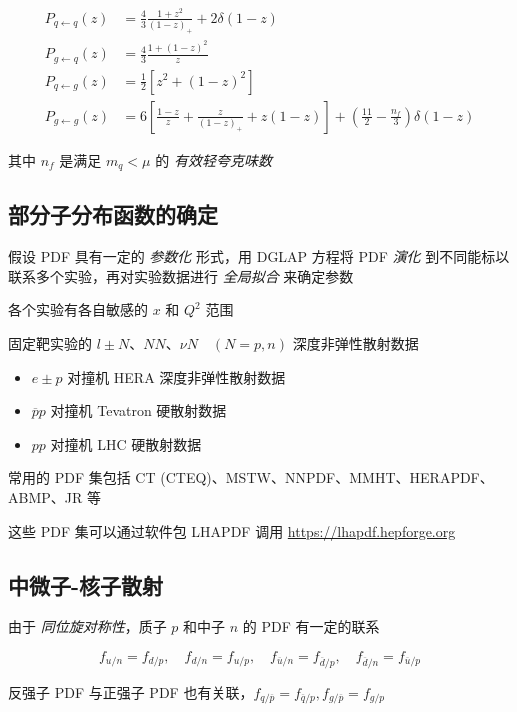 \documentclass[oneside,a4paper,openany,11pt]{ctexbook}
\begin{document}
\begin{align}
    P_{q \gets q}(z) &= \frac{4}{3} \frac{1+z^2}{(1-z)_+} + 2\delta(1-z) \\
    P_{g \gets q}(z) &= \frac{4}{3} \frac{1+(1-z)^2}{z} \\
    P_{q \gets g}(z) &= \frac{1}{2} \left[z^2 + (1-z)^2\right] \\
    P_{g \gets g}(z) &= 6 \left[\frac{1-z}{z} + \frac{z}{(1-z)_+} + z(1-z)\right] + \left(\frac{11}{2} - \frac{n_f}{3}\right) \delta(1-z)
\end{align}

其中 $n_f$ 是满足 $m_q < \mu$ 的 \emph{有效轻夸克味数}

\subsection{部分子分布函数的确定}

假设 PDF 具有一定的 \emph{参数化} 形式，用 DGLAP 方程将 PDF \emph{演化} 到不同能标以联系多个实验，再对实验数据进行 \emph{全局拟合} 来确定参数

各个实验有各自敏感的 $x$ 和 $Q^2$ 范围

固定靶实验的 $l \pm N$、$NN$、$\nu N \quad (N = p, n)$ 深度非弹性散射数据

\begin{itemize}
    \item $e \pm p$ 对撞机 HERA 深度非弹性散射数据
    \item $\overline{p} p$ 对撞机 Tevatron 硬散射数据
    \item $pp$ 对撞机 LHC 硬散射数据
\end{itemize}

常用的 PDF 集包括 CT (CTEQ)、MSTW、NNPDF、MMHT、HERAPDF、ABMP、JR 等

这些 PDF 集可以通过软件包 LHAPDF 调用 \url{https://lhapdf.hepforge.org}

\subsection{中微子-核子散射}

由于 \emph{同位旋对称性}，质子 $p$ 和中子 $n$ 的 PDF 有一定的联系

\begin{equation}
    f_{u/n} = f_{d/p}, \quad f_{d/n} = f_{u/p}, \quad f_{\overline{u}/n} = f_{\overline{d}/p}, \quad f_{\overline{d}/n} = f_{\overline{u}/p}
\end{equation}

反强子 PDF 与正强子 PDF 也有关联，$f_{q/\overline{p}} = f_{\overline{q}/p}, f_{g/\overline{p}} = f_{g/p}$
\end{document}
